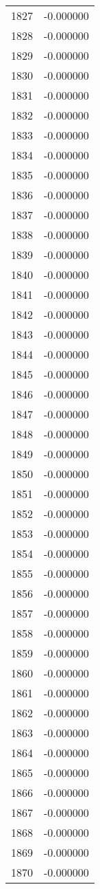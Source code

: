 \documentclass[12pt]{article}
\begin{document}
\begin{longtable}{@{}cc@{}}
1827 & -0.000000 \\
1828 & -0.000000 \\
1829 & -0.000000 \\
1830 & -0.000000 \\
1831 & -0.000000 \\
1832 & -0.000000 \\
1833 & -0.000000 \\
1834 & -0.000000 \\
1835 & -0.000000 \\
1836 & -0.000000 \\
1837 & -0.000000 \\
1838 & -0.000000 \\
1839 & -0.000000 \\
1840 & -0.000000 \\
1841 & -0.000000 \\
1842 & -0.000000 \\
1843 & -0.000000 \\
1844 & -0.000000 \\
1845 & -0.000000 \\
1846 & -0.000000 \\
1847 & -0.000000 \\
1848 & -0.000000 \\
1849 & -0.000000 \\
1850 & -0.000000 \\
1851 & -0.000000 \\
1852 & -0.000000 \\
1853 & -0.000000 \\
1854 & -0.000000 \\
1855 & -0.000000 \\
1856 & -0.000000 \\
1857 & -0.000000 \\
1858 & -0.000000 \\
1859 & -0.000000 \\
1860 & -0.000000 \\
1861 & -0.000000 \\
1862 & -0.000000 \\
1863 & -0.000000 \\
1864 & -0.000000 \\
1865 & -0.000000 \\
1866 & -0.000000 \\
1867 & -0.000000 \\
1868 & -0.000000 \\
1869 & -0.000000 \\
1870 & -0.000000 \\

\end{longtable}
\end{document}
